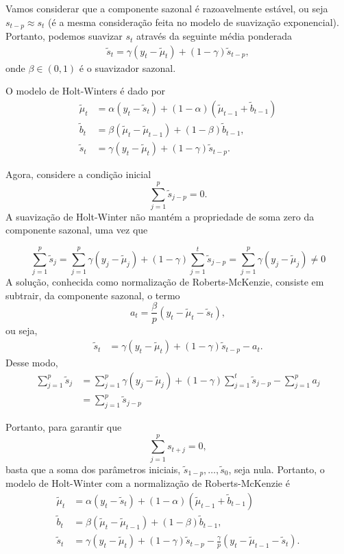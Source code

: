\documentclass[
  letterpaper,
  DIV=11,
  numbers=noendperiod]{scrreprt}
\theoremstyle{definition}
\theoremstyle{plain}
\theoremstyle{definition}
\theoremstyle{plain}
\theoremstyle{remark}
\begin{document}
Vamos considerar que a componente sazonal é razoavelmente estável, ou
seja \(s_{t-p}\approx s_t\) (é a mesma consideração feita no modelo de
suavização exponencial). Portanto, podemos suavizar \(s_t\) através da
seguinte média ponderada \[\begin{align*}
    \tilde{s}_t = \gamma (y_t - \tilde{\mu}_t) + (1-\gamma) \tilde{s}_{t-p},
    \end{align*}\] onde \(\beta\in(0,1)\) é o suavizador sazonal.

O modelo de Holt-Winters é dado por \[\begin{align*}
    \tilde{\mu}_t &=\alpha (y_t - \tilde{s}_t) + (1-\alpha) (\tilde{\mu}_{t-1}+ \tilde{b}_{t-1}) \\
        \tilde{b}_t &= \beta (\tilde{\mu}_t - \tilde{\mu}_{t-1}) + (1-\beta) \tilde{b}_{t-1}
,\\
    \tilde{s}_t &= \gamma (y_t - \tilde{\mu}_t) + (1-\gamma) \tilde{s}_{t-p}.
    \end{align*}\]

Agora, considere a condição inicial \[\sum_{j=1}^p \tilde{s}_{j-p}=0.\]
A suavização de Holt-Winter não mantém a propriedade de soma zero da
componente sazonal, uma vez que

\[\sum_{j=1}^p \tilde{s}_{j}=\sum_{j=1}^p\gamma(y_j-\tilde{\mu}_j)+(1-\gamma)\sum_{j=1}^t\tilde{s}_{j-p}=\sum_{j=1}^p\gamma(y_j-\tilde{\mu}_j)\neq 0\]
A solução, conhecida como normalização de Roberts-McKenzie, consiste em
subtrair, da componente sazonal, o termo
\[a_t=\frac{\beta}{p}(y_t-\tilde{\mu}_t-\tilde{s}_t),\] ou seja,
\[\begin{align}\tilde{s}_t &= \gamma (y_t - \tilde{\mu}_t) + (1-\gamma) \tilde{s}_{t-p}-a_t.
\end{align}\] Desse modo,
\[\begin{align}\sum_{j=1}^p \tilde{s}_{j}&=\sum_{j=1}^p\gamma(y_j-\tilde{\mu}_j)+(1-\gamma)\sum_{j=1}^t\tilde{s}_{j-p}-\sum_{j=1}^p a_j\\&=\sum_{j=1}^p\tilde{s}_{j-p}\end{align}\]

Portanto, para garantir que \[\sum_{j=1}^p s_{t+j}=0,\] basta que a soma
dos parâmetros iniciais, \(\tilde{s}_{1-p},\ldots,\tilde{s}_0\), seja
nula. Portanto, o modelo de Holt-Winter com a normalização de
Roberts-McKenzie é \[\begin{align*}
    \tilde{\mu}_t &=\alpha (y_t - \tilde{s}_t) + (1-\alpha) (\tilde{\mu}_{t-1}+ \tilde{b}_{t-1}) \\
        \tilde{b}_t &= \beta (\tilde{\mu}_t - \tilde{\mu}_{t-1}) + (1-\beta) \tilde{b}_{t-1}
,\\
    \tilde{s}_t &= \gamma (y_t - \tilde{\mu}_t) + (1-\gamma) \tilde{s}_{t-p}-\frac{\gamma}{p}(y_t-\tilde{\mu}_{t-1}-\tilde{s}_{t}).
    \end{align*}\]
\end{document}
